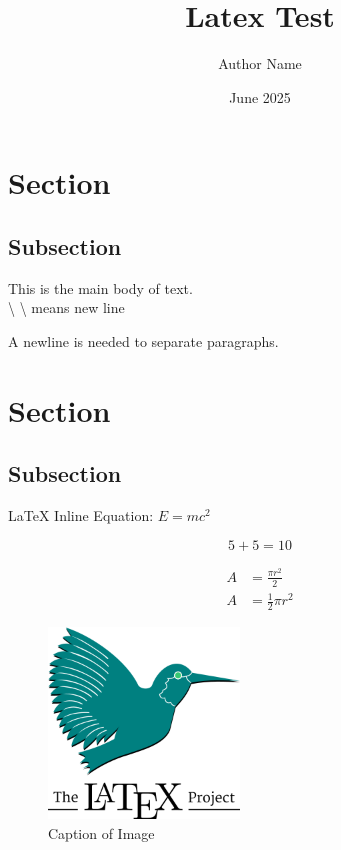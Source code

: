 \documentclass[12pt]{article}
\title{Latex Test}
\author{Author Name}
\date{June 2025}
\begin{document}
\maketitle

\section{Section}

\subsection{Subsection}
This is the main body of text. \\
\textbackslash{} \textbackslash{} means new line

A newline is needed to separate paragraphs.


\newpage

\section{Section}

\subsection{Subsection}



\LaTeX{}
Inline Equation: $E=mc^2$

\begin{equation}
    5+5=10
\end{equation}

\begin{equation}
    \begin{split}
        A & = \frac{\pi r^2}{2}   \\
        A & = \frac{1}{2} \pi r^2
    \end{split}
\end{equation}

\begin{figure}[H]
    \centering
    \includegraphics[width=2in]{latex.png}
    \caption{Caption of Image}\label{fig:my_label}
\end{figure}
\end{document}
